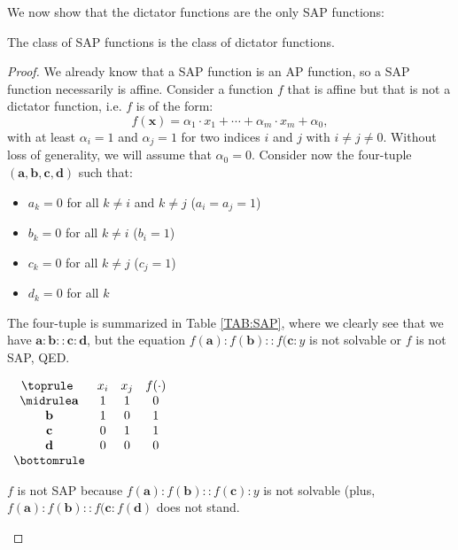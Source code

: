 We now show that the dictator functions are the only SAP functions:

\begin{proposition}
  The class of SAP functions is the class of dictator functions.
\end{proposition}
\begin{proof}
  We already know that a SAP function is an AP function, so a SAP function
  necessarily is affine. Consider a function $f$ that is affine but that is not
  a dictator function, i.e. $f$ is of the form:
  $$f(\mathbf{x}) = \alpha_1 \cdot x_1 + \cdots +\alpha_m \cdot x_m + \alpha_0,$$
  with at least $\alpha_i = 1$ and $\alpha_j = 1$ for two indices $i$ and $j$
  with $i\neq j \neq 0$. Without loss of generality, we will assume that
  $\alpha_0 = 0$.
  Consider now the four-tuple $(\mathbf{a}, \mathbf{b}, \mathbf{c},
  \mathbf{d})$ such that:
  \begin{itemize}
    \item $a_k = 0$ for all $k \neq i$ and $k\neq j$ ($a_i = a_j = 1$)
    \item $b_k = 0$ for all $k \neq i$ ($b_i = 1$)
    \item $c_k = 0$ for all $k \neq j$ ($c_j = 1$)
    \item $d_k = 0$ for all $k$
  \end{itemize}

  The four-tuple is summarized in Table \ref{TAB:SAP}, where we clearly see
  that we have $\mathbf{a} : \mathbf{b} :: \mathbf{c} : \mathbf{d}$, but the
  equation $f(\mathbf{a}) : f(\mathbf{b}) :: f(\mathbf{c} : y$ is not solvable
  or $f$ is not SAP, QED.

\begin{table}[ht]
  \center
$\begin{array}{cccc}
  \toprule
  ~ & x_i & x_j & f(\cdot) \\
  \midrule
  \mathbf{a} & 1 & 1 & 0\\
  \mathbf{b} & 1 & 0 & 1\\
  \mathbf{c} & 0 & 1 & 1\\
  \mathbf{d} & 0 & 0 & 0\\
  \bottomrule
\end{array}
$\bigskip
\caption{$f$ is not SAP because $f(\mathbf{a}) : f(\mathbf{b}) :: f(\mathbf{c})
  : y$ is not solvable (plus, $f(\mathbf{a}) : f(\mathbf{b}) :: f(\mathbf{c} :
  f(\mathbf{d})$ does not stand.}
\label{TAB:SAP}
\end{table}

\end{proof}


